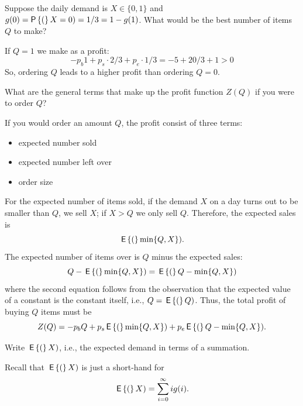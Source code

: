 \begin{question}
Suppose the daily demand is $X\in \{0,1\}$ and $g(0) = \P(X=0)=1/3 = 1- g(1)$. What would be the best number of items $Q$ to make? 
\begin{solution}
If $Q=1$ we make as a profit:
  \begin{equation*}
    -p_b 1 + p_s\cdot 2/3 + p_e\cdot 1/3 = -5 + 20/3 + 1> 0
  \end{equation*}
So, ordering $Q$ leads to a higher profit than ordering $Q=0$.
\end{solution}
\end{question}


\begin{question}
  What are the general terms that make up the profit function $Z(Q)$ if you were to order $Q$? 
  \begin{solution}
If you would order an amount $Q$, the profit consist of three terms: 
  \begin{itemize}
  \item expected number sold
  \item expected number left over
  \item order size
  \end{itemize}
  For the expected number of items sold, if the demand $X$ on a day
  turns out to be smaller than $Q$, we sell $X$; if $X>Q$ we only sell
  $Q$. Therefore, the expected sales is
  \begin{equation*}
    \,\mathsf{E}\left\{(\right\}\min\{Q,X\}). 
  \end{equation*}
The expected number of items over is $Q$ minus the expected sales: 
  \begin{equation*}
    Q-\,\mathsf{E}\left\{(\right\}\min\{Q,X\}) = 
    \,\mathsf{E}\left\{(\right\}Q-\min\{Q,X\})
  \end{equation*}
  where the second equation follows from the observation that the
  expected value of a constant is the constant itself, i.e.,
  $Q=\,\mathsf{E}\left\{(\right\}Q)$.  Thus, the total profit of buying $Q$ items must be
\begin{equation*}
Z(Q)=  -p_bQ+p_s\,\mathsf{E}\left\{(\right\}\min\{Q,X\}) + p_e\,\mathsf{E}\left\{(\right\}Q-\min\{Q,X\}).
\end{equation*}
  \end{solution}
\end{question}

\begin{question}
  Write $\,\mathsf{E}\left\{(\right\}X)$, i.e., the expected demand in terms of a summation.
  \begin{solution}
Recall that $\,\mathsf{E}\left\{(\right\}X)$ is just a short-hand for
    \begin{equation*}
      \,\mathsf{E}\left\{(\right\}X) = \sum_{i=0}^\infty i g(i).
    \end{equation*}
  \end{solution}
\end{question}

